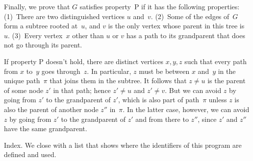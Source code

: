 \fi

Finally, we prove that $G$ satisfies property~P if it has the
following properties: (1)~There are two distinguished vertices $u$
and~$v$.  (2)~Some of the edges of~$G$ form a subtree rooted at~$u$,
and $v$ is the only vertex whose parent in this tree is~$u$.
(3)~Every vertex~$x$ other than $u$ or $v$ has a path to its
grandparent that does not go through its parent.

If property P doesn't hold, there are distinct vertices $x,y,z$ such
that every path from $x$ to~$y$ goes through~$z$. In particular, $z$ must be
between $x$ and~$y$ in the unique path~$\pi$ that joins them in the subtree.
It follows that $z\ne u$ is the parent of some node $z'$ in that path; hence
$z'\ne u$ and $z'\ne v$. But we can
avoid $z$ by going from $z'$ to the grandparent of $z'$, which is
also part of path~$\pi$ unless $z$ is also the parent of another node
$z''$ in~$\pi$. In the latter case, however,
we can avoid $z$ by going from $z'$ to the grandparent of $z'$ and from there
to $z''$, since $z'$ and $z''$ have the same grandparent.

\fi

Index. We close with a list that shows where the identifiers of this
program are defined and used.

\fi


\inx
\fin
\con
